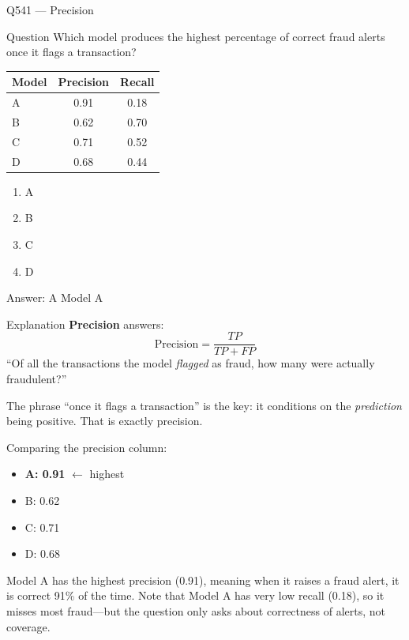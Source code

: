 \documentclass[aspectratio=169,8pt]{beamer}
\begin{document}
	\begin{frame}{Q541 --- Precision}
		\begin{block}{Question}
			Which model produces the highest percentage of correct fraud alerts once it flags a transaction?
			
			\begin{center}
				\begin{tabular}{lcc}
					\hline
					Model & Precision & Recall\\
					\hline
					A & 0.91 & 0.18\\
					B & 0.62 & 0.70\\
					C & 0.71 & 0.52\\
					D & 0.68 & 0.44\\
					\hline
				\end{tabular}
			\end{center}
			
			\begin{enumerate}
				\item A
				\item B
				\item C
				\item D
			\end{enumerate}
		\end{block}
		
		\begin{exampleblock}{Answer: A}
			Model A
		\end{exampleblock}
		
		\begin{block}{Explanation}
			\textbf{Precision} answers:
			\[
			\text{Precision} = \frac{TP}{TP+FP}
			\]
			``Of all the transactions the model \emph{flagged} as fraud, how many were
			actually fraudulent?''
			
			The phrase ``once it flags a transaction'' is the key: it conditions on the
			\emph{prediction} being positive. That is exactly precision.
			
			Comparing the precision column:
			\begin{itemize}
				\item \textbf{A: 0.91} \(\leftarrow\) highest
				\item B: 0.62
				\item C: 0.71
				\item D: 0.68
			\end{itemize}
			
			Model A has the highest precision (0.91), meaning when it raises a fraud alert,
			it is correct 91\% of the time. Note that Model A has very low recall (0.18),
			so it misses most fraud---but the question only asks about correctness of
			alerts, not coverage.
		\end{block}
	\end{frame}
	
\end{document}
